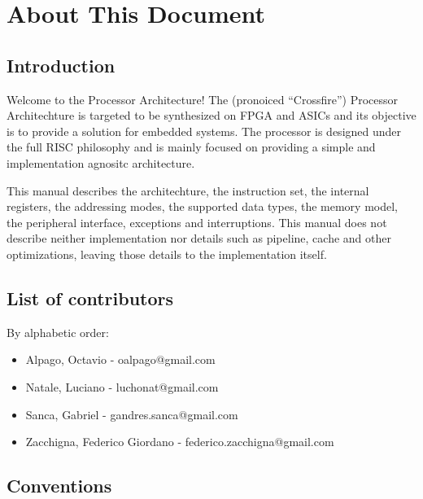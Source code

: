 \section{About This Document}
\label{sec:about}

\subsection{Introduction}
\label{ssec:introduction}
Welcome to the \xfire Processor Architecture! The \xfire (pronoiced ``Crossfire'') Processor Architechture is targeted
to be synthesized on FPGA and ASICs and its objective is to provide a solution for embedded systems. The processor is designed under the full RISC
philosophy and is mainly focused on providing a simple and implementation agnositc architecture.

This manual describes the architechture, the instruction set, the internal registers, the addressing modes, the supported data types, the memory model,
the peripheral interface, exceptions and interruptions. This manual does not describe neither implementation nor details such as pipeline,
cache and other optimizations, leaving those details to the implementation itself.

\subsection{List of contributors}
\label{ssec:contributors}
By alphabetic order:
\begin{itemize}
\item Alpago, Octavio - oalpago@gmail.com
\item Natale, Luciano - luchonat@gmail.com
\item Sanca, Gabriel - gandres.sanca@gmail.com
\item Zacchigna, Federico Giordano  - federico.zacchigna@gmail.com
\end{itemize}

\subsection{Conventions}
\label{ssec:conventions}
